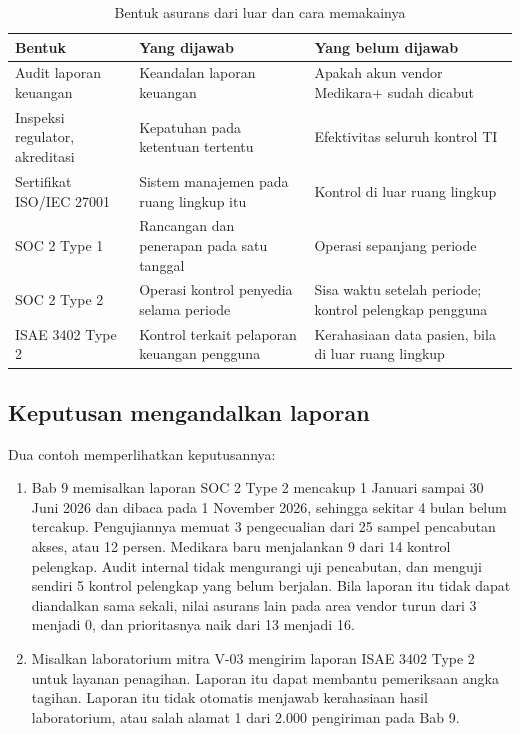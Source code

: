\begin{table}[!htb]
  \centering\small
  \caption{Bentuk asurans dari luar dan cara memakainya}\label{tab:ch12-asurans-luar}
  \begin{tabularx}{\textwidth}{|>{\raggedright\arraybackslash}p{}|>{\raggedright\arraybackslash}X|>{\raggedright\arraybackslash}X|}
    \hline
    \textbf{Bentuk} & \textbf{Yang dijawab} & \textbf{Yang belum dijawab} \\ \hline
    Audit laporan keuangan & Keandalan laporan keuangan & Apakah akun vendor Medikara+ sudah dicabut
    \\ \hline
    Inspeksi regulator, akreditasi & Kepatuhan pada ketentuan tertentu & Efektivitas seluruh
    kontrol TI \\ \hline
    Sertifikat ISO/IEC 27001 & Sistem manajemen pada ruang lingkup itu & Kontrol di luar ruang
    lingkup \\ \hline
    SOC 2 Type 1 & Rancangan dan penerapan pada satu tanggal & Operasi sepanjang periode \\ \hline
    SOC 2 Type 2 & Operasi kontrol penyedia selama periode & Sisa waktu setelah periode; kontrol
    pelengkap pengguna \\ \hline
    ISAE 3402 Type 2 & Kontrol terkait pelaporan keuangan pengguna & Kerahasiaan data pasien, bila
    di luar ruang lingkup \\ \hline
  \end{tabularx}
\end{table}

\subsection*{Keputusan mengandalkan laporan}

Dua contoh memperlihatkan keputusannya:
\begin{enumerate}
  \item Bab 9 memisalkan laporan SOC 2 Type 2 mencakup 1 Januari sampai 30 Juni 2026 dan dibaca pada
  1 November 2026, sehingga sekitar 4 bulan belum tercakup. Pengujiannya memuat 3 pengecualian dari
  25 sampel pencabutan akses, atau 12 persen. Medikara baru menjalankan 9 dari 14 kontrol pelengkap.
  Audit internal tidak mengurangi uji pencabutan, dan menguji sendiri 5 kontrol pelengkap yang belum
  berjalan. Bila laporan itu tidak dapat diandalkan sama sekali, nilai asurans lain pada area vendor
  turun dari 3 menjadi 0, dan prioritasnya naik dari 13 menjadi 16.
  \item Misalkan laboratorium mitra V-03 mengirim laporan ISAE 3402 Type 2 untuk layanan penagihan.
  Laporan itu dapat membantu pemeriksaan angka tagihan. Laporan itu tidak otomatis menjawab
  kerahasiaan hasil laboratorium, atau salah alamat 1 dari 2.000 pengiriman pada Bab 9.
\end{enumerate}

